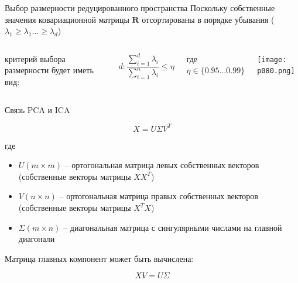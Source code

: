 \documentclass[pdf, intlimits, 9pt, unicode]{beamer}
\begin{document}
\begin{frame}{Выбор размерности редуцированного пространства}
Поскольку собственные значения ковариационной матрицы $\mathbf{R}$ отсортированы в порядке убывания ($\lambda_1 \geq \lambda_1 \dots \geq \lambda_d$)\pause
\bigskip 
\begin{columns}[c,onlytextwidth]
критерий выбора размерности будет иметь вид:

$$d:\frac{\sum_{i=1}^{d}{\lambda_i}}{\sum_{i=1}^{n}{\lambda_i}} \leq \eta$$

где $\eta \in \{0.95 \dots 0.99\}$

\begin{center}\texttt{[image: p080.png]}\end{center}
\end{columns}
\end{frame}







\begin{frame}{Связь PCA и ICA}

$$X = U \Sigma V^T$$

где

\begin{itemize}
\item $U(m \times m)$ -- ортогональная матрица левых собственных векторов (собственные векторы матрицы $X X^T$)\pause
\item $V(n \times n)$ -- ортогональная матрица правых собственных векторов (собственные векторы матрицы $X^T X$)\pause
\item $\Sigma (m \times n)$ -- диагональная матрица с сингулярными числами на главной диагонали
\end{itemize}\pause

Матрица главных компонент может быть вычислена:

$$XV = U \Sigma$$

\end{frame}
\end{document}
